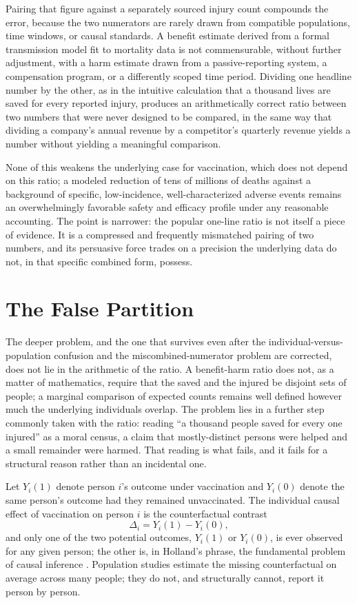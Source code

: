 \documentclass[11pt]{article}
\begin{document}
Pairing that figure against a separately sourced injury count compounds the error, because the two numerators are rarely drawn from compatible populations, time windows, or causal standards. A benefit estimate derived from a formal transmission model fit to mortality data is not commensurable, without further adjustment, with a harm estimate drawn from a passive-reporting system, a compensation program, or a differently scoped time period. Dividing one headline number by the other, as in the intuitive calculation that a thousand lives are saved for every reported injury, produces an arithmetically correct ratio between two numbers that were never designed to be compared, in the same way that dividing a company's annual revenue by a competitor's quarterly revenue yields a number without yielding a meaningful comparison.

None of this weakens the underlying case for vaccination, which does not depend on this ratio; a modeled reduction of tens of millions of deaths against a background of specific, low-incidence, well-characterized adverse events remains an overwhelmingly favorable safety and efficacy profile under any reasonable accounting. The point is narrower: the popular one-line ratio is not itself a piece of evidence. It is a compressed and frequently mismatched pairing of two numbers, and its persuasive force trades on a precision the underlying data do not, in that specific combined form, possess.

\section{The False Partition}

The deeper problem, and the one that survives even after the individual-versus-population confusion and the miscombined-numerator problem are corrected, does not lie in the arithmetic of the ratio. A benefit-harm ratio does not, as a matter of mathematics, require that the saved and the injured be disjoint sets of people; a marginal comparison of expected counts remains well defined however much the underlying individuals overlap. The problem lies in a further step commonly taken with the ratio: reading ``a thousand people saved for every one injured'' as a moral census, a claim that mostly-distinct persons were helped and a small remainder were harmed. That reading is what fails, and it fails for a structural reason rather than an incidental one.

Let $Y_i(1)$ denote person $i$'s outcome under vaccination and $Y_i(0)$ denote the same person's outcome had they remained unvaccinated. The individual causal effect of vaccination on person $i$ is the counterfactual contrast
\[
\Delta_i = Y_i(1) - Y_i(0),
\]
and only one of the two potential outcomes, $Y_i(1)$ or $Y_i(0)$, is ever observed for any given person; the other is, in Holland's phrase, the fundamental problem of causal inference \citep{holland1986}. Population studies estimate the missing counterfactual on average across many people; they do not, and structurally cannot, report it person by person.
\end{document}
